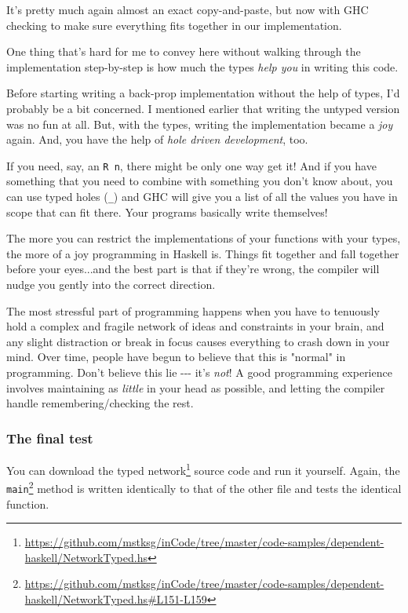 \documentclass[]{article}
\renewcommand{\href}[2]{#2\footnote{\url{#1}}}
\begin{document}
It's pretty much again almost an exact copy-and-paste, but now with GHC checking
to make sure everything fits together in our implementation.

One thing that's hard for me to convey here without walking through the
implementation step-by-step is how much the types \emph{help you} in writing
this code.

Before starting writing a back-prop implementation without the help of types,
I'd probably be a bit concerned. I mentioned earlier that writing the untyped
version was no fun at all. But, with the types, writing the implementation
became a \emph{joy} again. And, you have the help of \emph{hole driven
development}, too.

If you need, say, an \texttt{R\ n}, there might be only one way get it! And if
you have something that you need to combine with something you don't know about,
you can use typed holes (\texttt{\_}) and GHC will give you a list of all the
values you have in scope that can fit there. Your programs basically write
themselves!

The more you can restrict the implementations of your functions with your types,
the more of a joy programming in Haskell is. Things fit together and fall
together before your eyes...and the best part is that if they're wrong, the
compiler will nudge you gently into the correct direction.

The most stressful part of programming happens when you have to tenuously hold a
complex and fragile network of ideas and constraints in your brain, and any
slight distraction or break in focus causes everything to crash down in your
mind. Over time, people have begun to believe that this is "normal" in
programming. Don't believe this lie -\/-\/- it's \emph{not}! A good programming
experience involves maintaining as \emph{little} in your head as possible, and
letting the compiler handle remembering/checking the rest.

\subsubsection{The final test}

You can download the
\href{https://github.com/mstksg/inCode/tree/master/code-samples/dependent-haskell/NetworkTyped.hs}{typed
network} source code and run it yourself. Again, the
\href{https://github.com/mstksg/inCode/tree/master/code-samples/dependent-haskell/NetworkTyped.hs\#L151-L159}{\texttt{main}}
method is written identically to that of the other file and tests the identical
function.
\end{document}
